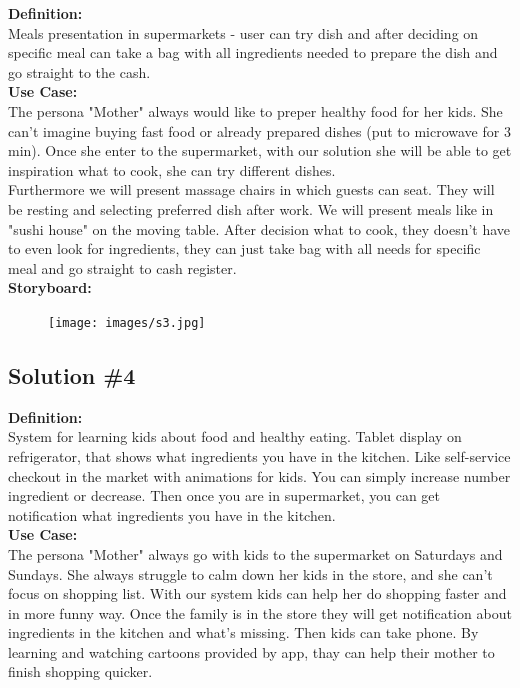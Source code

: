 \documentclass[a4paper,10pt,oneside]{scrreprt}
\begin{document}
		\noindent \textbf{Definition:}\\
			Meals presentation in supermarkets - user can try dish and after deciding on specific meal can take a bag with all ingredients needed to prepare the dish and go straight to the cash.\\

			\noindent \textbf{Use Case:}\\
			The persona "Mother" always would like to preper healthy food for her kids. She can't imagine buying fast food or
already prepared dishes (put to microwave for 3 min). Once she enter to the supermarket, with our solution she will
be able to get inspiration what to cook, she can try different dishes.\\

			Furthermore we will present massage chairs in which guests can seat. They will be resting and selecting preferred dish after work. We will present meals like in "sushi house" on the moving table. After decision what to cook, they doesn't have to
even look for ingredients, they can just take bag with all needs for specific meal and go straight to cash register.\\

			\noindent \textbf{Storyboard:}\\

			\begin{figure}[h]
				\centering
				\texttt{[image: images/s3.jpg]}
			\end{figure}

		\clearpage

		\subsection{Solution \#4}

		\noindent \textbf{Definition:}\\
			System for learning kids about food and healthy eating. Tablet display on refrigerator, that shows what ingredients you have in the kitchen. Like self-service checkout in the market with animations for kids. You can simply increase number ingredient or decrease. Then once you are in supermarket, you can get notification what ingredients you have in the kitchen.\\

			\noindent \textbf{Use Case:}\\
			The persona "Mother" always go with kids to the supermarket on Saturdays and  Sundays. She always struggle to calm down her kids in the store, and she can't focus on shopping list. With our system kids can help her do shopping faster and in more funny way. Once the family is in the store they will get notification about ingredients in the kitchen and what's missing. Then kids can take phone. By learning and watching cartoons provided by app, thay can help their mother to finish shopping quicker.\\
\end{document}
